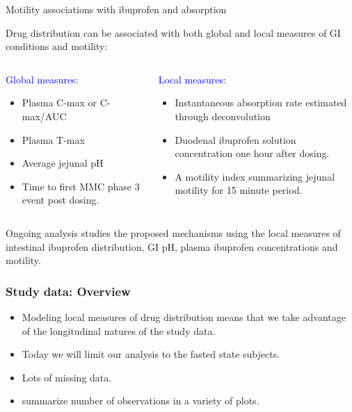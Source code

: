 \documentclass[handout]{beamer}
\begin{document}
\begin{frame}{Motility associations with ibuprofen and absorption}

	Drug distribution can be associated with both global and local measures of GI conditions and motility:

	\bigskip

	\begin{columns}[t]
		\begin{column}{.5\textwidth}
			\textcolor{blue}{Global measures}:
			\footnotesize
			\begin{itemize}
				\item Plasma C-max or C-max/AUC
				\item Plasma T-max
				\item Average jejunal pH
				\item Time to first MMC phase 3 event post dosing.
			\end{itemize}
		\end{column}
		\begin{column}{.5\textwidth}
			\small
			\textcolor{blue}{Local measures}:
			\footnotesize
			\begin{itemize}
				\item Instantaneous absorption rate estimated through deconvolution
				\item Duodenal ibuprofen solution concentration one hour after dosing.
				\item A motility index summarizing jejunal motility for 15 minute period.
			\end{itemize}
		\end{column}
	\end{columns}


	\bigskip

	Ongoing analysis studies the proposed mechanisms using the local measures of intestinal ibuprofen distribution, GI pH, plasma ibuprofen concentrations and motility.

\end{frame}

\begin{frame}\frametitle{Study data: Overview}
	\begin{itemize}
		\item Modeling local measures of drug distribution means that we take advantage of the longitudinal natures of the study data.
		\item Today we will limit our analysis to the fasted state subjects.
		\item Lots of missing data.
		\item summarize number of observations in a variety of plots.
	\end{itemize}

\end{frame}
\end{document}
